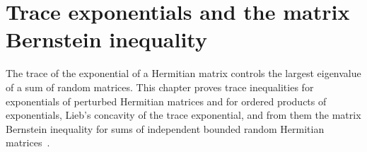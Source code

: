 \chapter{Trace exponentials and the matrix Bernstein inequality}
\label{ch:matrix_bernstein}

The trace of the exponential of a Hermitian matrix controls the largest
eigenvalue of a sum of random matrices. This chapter proves trace inequalities
for exponentials of perturbed Hermitian matrices and for ordered products of
exponentials, Lieb's concavity of the trace exponential, and from them the
matrix Bernstein inequality for sums of independent bounded random Hermitian
matrices~\cite{Tropp2012User}.






